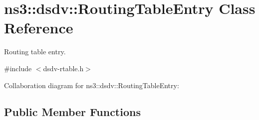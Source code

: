 \hypertarget{classns3_1_1dsdv_1_1RoutingTableEntry}{}\section{ns3\+:\+:dsdv\+:\+:Routing\+Table\+Entry Class Reference}
\label{classns3_1_1dsdv_1_1RoutingTableEntry}


Routing table entry.  




{\ttfamily \#include $<$dsdv-\/rtable.\+h$>$}



Collaboration diagram for ns3\+:\+:dsdv\+:\+:Routing\+Table\+Entry\+:
\subsection*{Public Member Functions}
